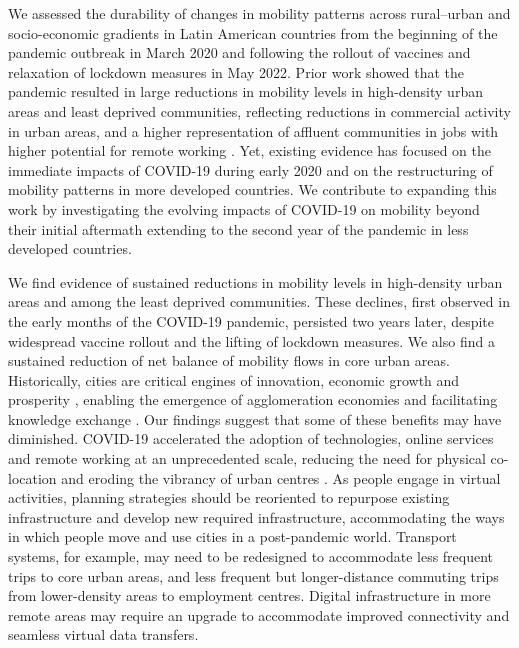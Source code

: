 \documentclass[fleqn,10pt]{wlscirep}
\begin{document}
We assessed the durability of changes in mobility patterns across rural–urban and socio-economic gradients in Latin American countries from the beginning of the pandemic outbreak in March 2020 and following the rollout of vaccines and relaxation of lockdown measures in May 2022. Prior work showed that the pandemic resulted in large reductions in mobility levels in high-density urban areas and least deprived communities, reflecting reductions in commercial activity in urban areas, and a higher representation of affluent communities in jobs with higher potential for remote working \cite{bartik2020jobs}. Yet, existing evidence has focused on the immediate impacts of COVID-19 during early 2020 and on the restructuring of mobility patterns in more developed countries. We contribute to expanding this work by investigating the evolving impacts of COVID-19 on mobility beyond their initial aftermath extending to the second year of the pandemic in less developed countries.

We find evidence of sustained reductions in mobility levels in high-density urban areas and among the least deprived communities. These declines, first observed in the early months of the COVID-19 pandemic, persisted two years later, despite widespread vaccine rollout and the lifting of lockdown measures. We also find a sustained reduction of net balance of mobility flows in core urban areas. Historically, cities are critical engines of innovation, economic growth and prosperity \cite{Glaeser10}, enabling the emergence of agglomeration economies and facilitating knowledge exchange \cite{storper2004}. Our findings suggest that some of these benefits may have diminished. COVID-19 accelerated the adoption of technologies, online services and remote working at an unprecedented scale, reducing the need for physical co-location and eroding the vibrancy of urban centres \cite{Alexander21}. As people engage in virtual activities, planning strategies should be reoriented to repurpose existing infrastructure and develop new required infrastructure, accommodating the ways in which people move and use cities in a post-pandemic world. Transport systems, for example, may need to be redesigned to accommodate less frequent trips to core urban areas, and less frequent but longer-distance commuting trips from lower-density areas to employment centres. Digital infrastructure in more remote areas may require an upgrade to accommodate improved connectivity and seamless virtual data transfers.
\end{document}

